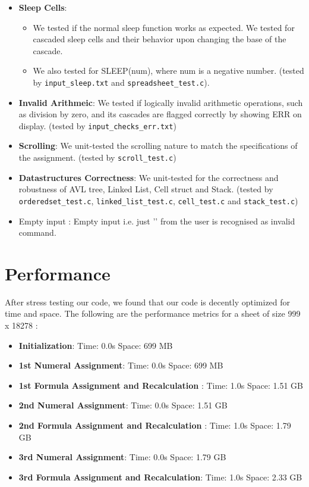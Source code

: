 \documentclass[10pt,a4paper]{article}  %
\begin{document}
\begin{itemize}
\begin{itemize}
    \end{itemize}
    \item \textbf{Sleep Cells}: 
    \begin{itemize}
        \item We tested if the normal sleep function works as expected. We tested for cascaded sleep cells and their behavior upon changing the base of the cascade. 
        \item We also tested for SLEEP(num), where num is a negative number. (tested by \texttt{input\_sleep.txt} and \texttt{spreadsheet\_test.c}).
    \end{itemize}
    \item \textbf{Invalid Arithmeic}: We tested if logically invalid arithmetic operations, such as division by zero, and its cascades are flagged correctly by showing ERR on display. (tested by \texttt{input\_checks\_err.txt})
    \item \textbf{Scrolling}: We unit-tested the scrolling nature to match the specifications of the assignment. (tested by \texttt{scroll\_test.c})
    \item \textbf{Datastructures Correctness}: We unit-tested for the correctness and robustness of AVL tree, Linked List, Cell struct and Stack. (tested by \texttt{orderedset\_test.c}, \texttt{linked\_list\_test.c}, \texttt{cell\_test.c} and \texttt{stack\_test.c})
    \item{Empty input} : Empty input i.e. just '\n' from the user is recognised as invalid command.
\end{itemize}

\section{Performance}
After stress testing our code, we found that our code is decently optimized for time and space. The following are the performance metrics for a sheet of size 999 x 18278 :

\begin{itemize}
    \item \textbf{Initialization}: Time: 0.0s Space: 699 MB
    \item \textbf{1st Numeral Assignment}: Time: 0.0s Space: 699 MB
    \item \textbf{1st Formula Assignment and Recalculation }: Time: 1.0s Space: 1.51 GB
    \item \textbf{2nd Numeral Assignment}: Time: 0.0s Space: 1.51 GB
    \item \textbf{2nd Formula Assignment and Recalculation }: Time: 1.0s Space: 1.79 GB
    \item \textbf{3rd Numeral Assignment}: Time: 0.0s Space: 1.79 GB
    \item \textbf{3rd Formula Assignment and Recalculation}: Time: 1.0s Space: 2.33 GB

    

\end{itemize}
\end{document}
